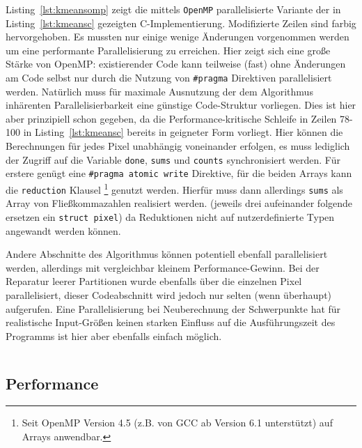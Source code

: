 \documentclass[
    bibliography=totoc, cd=lightcolor, cdmath=false, ngerman]{tudscrreprt}
\begin{document}
Listing~\ref{lst:kmeansomp} zeigt die mittels \texttt{OpenMP} parallelisierte
Variante der in Listing~\ref{lst:kmeansc} gezeigten C-Implementierung.
Modifizierte Zeilen sind farbig hervorgehoben. Es mussten nur einige wenige
Änderungen vorgenommen werden um eine performante Parallelisierung zu
erreichen. Hier zeigt sich eine große Stärke von OpenMP: existierender Code
kann teilweise (fast) ohne Änderungen am Code selbst nur durch die Nutzung von
\texttt{\#pragma} Direktiven parallelisiert werden.  Natürlich muss für
maximale Ausnutzung der dem Algorithmus inhärenten Parallelisierbarkeit eine
günstige Code-Struktur vorliegen. Dies ist hier aber prinzipiell schon gegeben,
da die Performance-kritische Schleife in Zeilen 78-100 in
Listing~\ref{lst:kmeansc} bereits in geigneter Form vorliegt.  Hier können die
Berechnungen für jedes Pixel unabhängig voneinander erfolgen, es muss lediglich
der Zugriff auf die Variable \texttt{done}, \texttt{sums} und \texttt{counts}
synchronisiert werden. Für erstere genügt eine \texttt{\#pragma atomic write}
Direktive, für die beiden Arrays kann die \texttt{reduction} Klausel
\footnote{Seit OpenMP Version 4.5 (z.B. von GCC ab Version 6.1 unterstützt) auf
Arrays anwendbar.} genutzt werden. Hierfür muss dann allerdings \texttt{sums}
als Array von Fließkommazahlen realisiert werden.  (jeweils drei aufeinander
folgende ersetzen ein \texttt{struct pixel}) da Reduktionen nicht auf
nutzerdefinierte Typen angewandt werden können.

Andere Abschnitte des Algorithmus können potentiell ebenfall parallelisiert
werden, allerdings mit vergleichbar kleinem Performance-Gewinn. Bei der
Reparatur leerer Partitionen wurde ebenfalls über die einzelnen Pixel
parallelisiert, dieser Codeabschnitt wird jedoch nur selten (wenn überhaupt)
aufgerufen. Eine Parallelisierung bei Neuberechnung der Schwerpunkte
hat für realistische Input-Größen keinen starken Einfluss auf die
Ausführungszeit des Programms ist hier aber ebenfalls einfach möglich.

\inputminted[firstline=207, label=kmeansomp, highlightlines={
215, 222-223, 233-234, 246, 251-254, 286, 293-294, 299, 308-311, 313-316, 324,
327, 330-332, 334}]{C}{c/src/kmeans.c}

\subsection{Performance}
\end{document}
